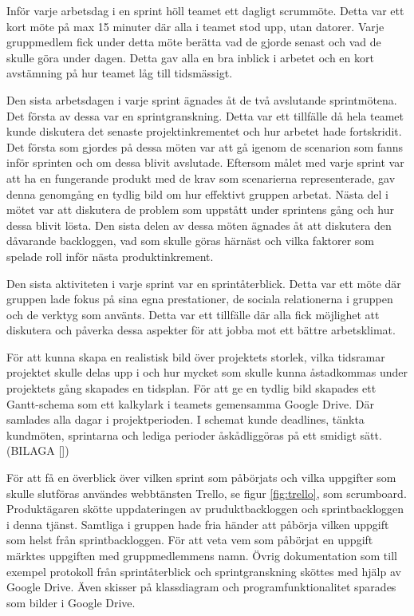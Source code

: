 Inför varje arbetsdag i en sprint höll teamet ett dagligt scrummöte. Detta var ett kort möte på max 15 minuter där alla i teamet stod upp, utan datorer. Varje gruppmedlem fick under detta möte berätta vad de gjorde senast och vad de skulle göra under dagen. Detta gav alla en bra inblick i arbetet och en kort avstämning på hur teamet låg till tidsmässigt.

Den sista arbetsdagen i varje sprint ägnades åt de två avslutande sprintmötena. Det första av dessa var en sprintgranskning. Detta var ett tillfälle då hela teamet kunde diskutera det senaste projektinkrementet och hur arbetet hade fortskridit. Det första som gjordes på dessa möten var att gå igenom de scenarion som fanns inför sprinten och om dessa blivit avslutade. Eftersom målet med varje sprint var att ha en fungerande produkt med de krav som scenarierna representerade, gav denna genomgång en tydlig bild om hur effektivt gruppen arbetat. Nästa del i mötet var att diskutera de problem som uppstått under sprintens gång och hur dessa blivit lösta. Den sista delen av dessa möten ägnades åt att diskutera den dåvarande backloggen, vad som skulle göras härnäst och vilka faktorer som spelade roll inför nästa produktinkrement.

Den sista aktiviteten i varje sprint var en sprintåterblick. Detta var ett möte där gruppen lade fokus på sina egna prestationer, de sociala relationerna i gruppen och de verktyg som använts. Detta var ett tillfälle där alla fick möjlighet att diskutera och påverka dessa aspekter för att jobba mot ett bättre arbetsklimat.

För att kunna skapa en realistisk bild över projektets storlek, vilka tidsramar projektet skulle delas upp i och hur mycket som skulle kunna åstadkommas under projektets gång skapades en tidsplan. För att ge en tydlig bild skapades ett Gantt-schema \cite{softwareeng} som ett kalkylark i teamets gemensamma Google Drive. Där samlades alla dagar i projektperioden. I schemat kunde deadlines, tänkta kundmöten, sprintarna och lediga perioder åskådliggöras på ett smidigt sätt. (BILAGA [])

För att få en överblick över vilken sprint som påbörjats och vilka uppgifter som skulle slutföras användes webbtänsten Trello, se figur \ref{fig:trello}, som scrumboard\cite{scrumboard}. Produktägaren skötte uppdateringen av pruduktbackloggen och sprintbackloggen i denna tjänst. Samtliga i gruppen hade fria händer att påbörja vilken uppgift som helst från sprintbackloggen. För att veta vem som påbörjat en uppgift märktes uppgiften med gruppmedlemmens namn. Övrig dokumentation som till exempel protokoll från sprintåterblick och sprintgranskning sköttes med hjälp av Google Drive. Även skisser på klassdiagram och programfunktionalitet sparades som bilder i Google Drive.

